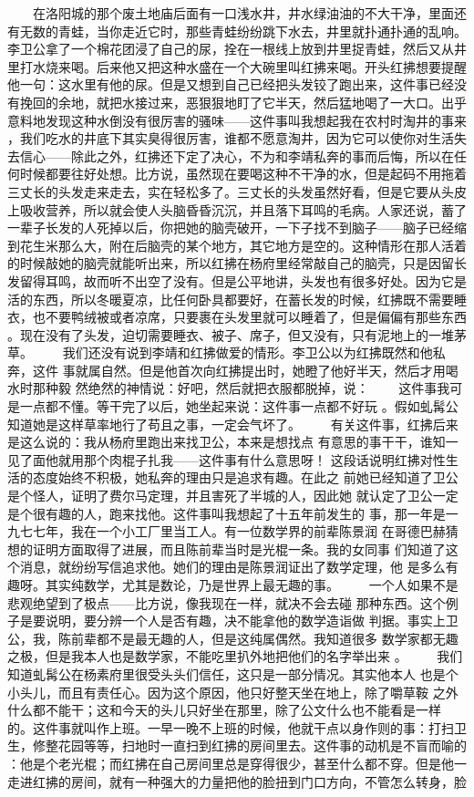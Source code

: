  　　在洛阳城的那个废土地庙后面有一口浅水井，井水绿油油的不大干净，里面还 有无数的青蛙，当你走近它时，那些青蛙纷纷跳下水去，井里就扑通扑通的乱响。 李卫公拿了一个棉花团浸了自己的尿，拴在一根线上放到井里捉青蛙，然后又从井 里打水烧来喝。后来他又把这种水盛在一个大碗里叫红拂来喝。开头红拂想要提醒 他一句：这水里有他的尿。但是又想到自己已经把头发铰了跑出来，这件事已经没 有挽回的余地，就把水接过来，恶狠狠地盯了它半天，然后猛地喝了一大口。出乎 意料地发现这种水倒没有很厉害的骚味——这件事叫我想起我在农村时淘井的事来 ，我们吃水的井底下其实臭得很厉害，谁都不愿意淘井，因为它可以使你对生活失 去信心——除此之外，红拂还下定了决心，不为和李靖私奔的事而后悔，所以在任 何时候都要往好处想。比方说，虽然现在要喝这种不干净的水，但是起码不用拖着 三丈长的头发走来走去，实在轻松多了。三丈长的头发虽然好看，但是它要从头皮 上吸收营养，所以就会使人头脑昏昏沉沉，并且落下耳鸣的毛病。人家还说，蓄了 一辈子长发的人死掉以后，你把她的脑壳破开，一下子找不到脑子——脑子已经缩 到花生米那么大，附在后脑壳的某个地方，其它地方是空的。这种情形在那人活着 的时候敲她的脑壳就能听出来，所以红拂在杨府里经常敲自己的脑壳，只是因留长 发留得耳鸣，故而听不出空了没有。但是公平地讲，头发也有很多好处。因为它是 活的东西，所以冬暖夏凉，比任何卧具都要好，在蓄长发的时候，红拂既不需要睡 衣，也不要鸭绒被或者凉席，只要裹在头发里就可以睡着了，但是偏偏有那些东西 。现在没有了头发，迫切需要睡衣、被子、席子，但又没有，只有泥地上的一堆茅 草。 　　我们还没有说到李靖和红拂做爱的情形。李卫公以为红拂既然和他私奔，这件 事就属自然。但是他首次向红拂提出时，她瞪了他好半天，然后才用喝水时那种毅 然绝然的神情说：好吧，然后就把衣服都脱掉，说： 　　这件事我可是一点都不懂。等干完了以后，她坐起来说：这件事一点都不好玩 。假如虬髯公知道她是这样草率地行了苟且之事，一定会气坏了。 　　有关这件事，红拂后来是这么说的：我从杨府里跑出来找卫公，本来是想找点 有意思的事干干，谁知一见了面他就用那个肉棍子扎我——这件事有什么意思呀！ 这段话说明红拂对性生活的态度始终不积极，她私奔的理由只是追求有趣。在此之 前她已经知道了卫公是个怪人，证明了费尔马定理，并且害死了半城的人，因此她 就认定了卫公一定是个很有趣的人，跑来找他。这件事叫我想起了十五年前发生的 事，那一年是一九七七年，我在一个小工厂里当工人。有一位数学界的前辈陈景润 在哥德巴赫猜想的证明方面取得了进展，而且陈前辈当时是光棍一条。我的女同事 们知道了这个消息，就纷纷写信追求他。她们的理由是陈景润证出了数学定理，他 是多么有趣呀。其实纯数学，尤其是数论，乃是世界上最无趣的事。 　　一个人如果不是悲观绝望到了极点——比方说，像我现在一样，就决不会去碰 那种东西。这个例子是要说明，要分辨一个人是否有趣，决不能拿他的数学造诣做 判据。事实上卫公，我，陈前辈都不是最无趣的人，但是这纯属偶然。我知道很多 数学家都无趣之极，但是我本人也是数学家，不能吃里扒外地把他们的名字举出来 。 　　我们知道虬髯公在杨素府里很受头头们信任，这只是一部分情况。其实他本人 也是个小头儿，而且有责任心。因为这个原因，他只好整天坐在地上，除了嚼草鞍 之外什么都不能干；这和今天的头儿只好坐在那里，除了公文什么也不能看是一样 的。这件事就叫作上班。一早一晚不上班的时候，他就干点以身作则的事：打扫卫 生，修整花园等等，扫地时一直扫到红拂的房间里去。这件事的动机是不盲而喻的 ：他是个老光棍；而红拂在自己房间里总是穿得很少，甚至什么都不穿。但是他一 走进红拂的房间，就有一种强大的力量把他的脸扭到门口方向，不管怎么转身，脸 